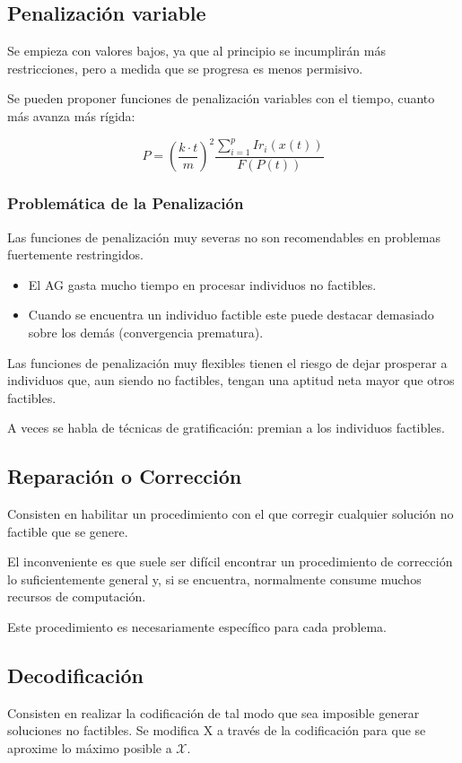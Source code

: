 \documentclass[12pt, twoside, openright]{report} %
\begin{document}
\subsection{Penalización variable}
Se empieza con valores bajos, ya que al principio se incumplirán más restricciones, pero a medida que se progresa es menos permisivo.

Se pueden proponer funciones de penalización variables con el tiempo, cuanto más avanza más rígida: 

$$P = \left(\frac {k \cdot t} {m} \right)^2 \frac {\sum^p_{i=1} Ir_i(x(t))} {F(P(t))}$$

\subsubsection{Problemática de la Penalización}
Las funciones de penalización muy severas no son recomendables en problemas fuertemente restringidos.
\begin{itemize}
	\item El AG gasta mucho tiempo en procesar individuos no factibles.
	\item Cuando se encuentra un individuo factible este puede destacar demasiado sobre los demás (convergencia prematura).
\end{itemize}

Las funciones de penalización muy flexibles tienen el riesgo de dejar prosperar a individuos que, aun siendo no factibles, tengan una aptitud neta mayor que otros factibles.

A veces se habla de técnicas de gratificación: premian a los individuos factibles.

\subsection{Reparación o Corrección}
Consisten en habilitar un procedimiento con el que corregir cualquier solución no factible que se genere.

El inconveniente es que suele ser difícil encontrar un procedimiento de corrección lo suficientemente general y, si se encuentra, normalmente consume muchos recursos de computación.

Este procedimiento es necesariamente específico para cada problema.

\subsection{Decodificación}
Consisten en realizar la codificación de tal modo que sea imposible generar soluciones no factibles. Se modifica X a través de la codificación para que se aproxime lo máximo posible a $\mathcal{X}$.
\end{document}
